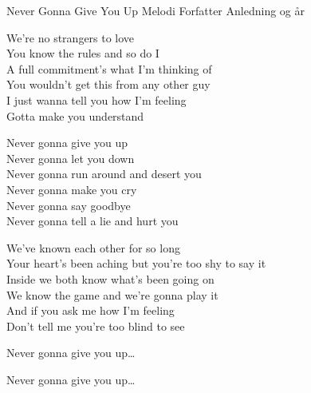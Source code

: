 \begin{song}{Never Gonna Give You Up}
  {} %
  {Melodi} %
  {Forfatter} %
  {Anledning og år} %
  {\NotCCLIed} %

  \begin{SBVerse}
    We're no strangers to love\\
    You know the rules and so do I\\
    A full commitment's what I'm thinking of\\
    You wouldn't get this from any other guy\\\medskip
    I just wanna tell you how I'm feeling\\
    Gotta make you understand
  \end{SBVerse}

  \begin{SBChorus}
    Never gonna give you up\\
    Never gonna let you down\\
    Never gonna run around and desert you\\
    Never gonna make you cry\\
    Never gonna say goodbye\\
    Never gonna tell a lie and hurt you
  \end{SBChorus}

  \begin{SBVerse}
    We've known each other for so long\\
    Your heart's been aching but you're too shy to say it\\
    Inside we both know what's been going on\\
    We know the game and we're gonna play it\\\medskip
    And if you ask me how I'm feeling\\
    Don't tell me you're too blind to see
  \end{SBVerse}

  \begin{SBChorus}
    Never gonna give you up\ldots
  \end{SBChorus}

  \begin{SBChorus}
    Never gonna give you up\ldots
  \end{SBChorus}


\end{song}
